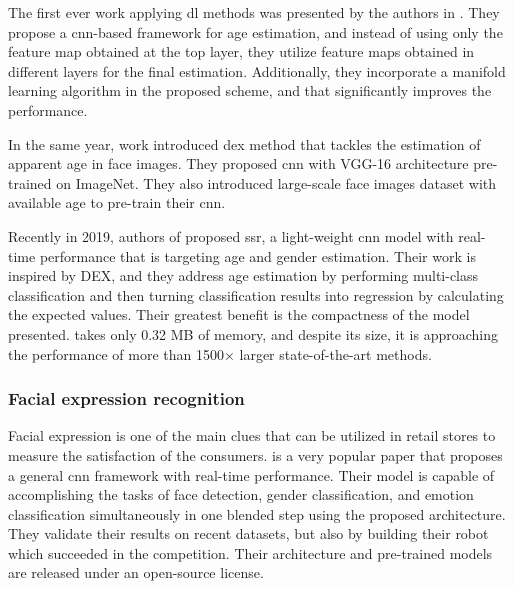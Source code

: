             The first ever work applying \gls{dl} methods was presented by the authors in \cite{wang2015deeply}. They propose a \gls{cnn}-based framework for age estimation, and instead of using only the feature map obtained at the top layer, they utilize feature maps obtained in different layers for the final estimation. Additionally, they incorporate a manifold learning algorithm in the proposed scheme, and that significantly improves the performance.

            In the same year, work \cite{rothe2015dex} introduced \gls{dex} method that tackles the estimation of apparent age in face images. They proposed \gls{cnn} with VGG-16 architecture pre-trained on ImageNet. They also introduced large-scale face images dataset with available age to pre-train their \gls{cnn}. 

            Recently in 2019, authors of \cite{yang2018ssr} proposed \gls{ssr}, a light-weight \gls{cnn} model with real-time performance that is targeting age and gender estimation. Their work is inspired by DEX, and they address age estimation by performing multi-class classification and then turning classification results into regression by calculating the expected values. Their greatest benefit is the compactness of the model presented.  takes only 0.32 MB of memory, and despite its size, it is approaching the performance of more than 1500× larger state-of-the-art methods.
            
        \subsubsection{Facial expression recognition}
            Facial expression \cite{goodfellow2013challenges} is one of the main clues that can be utilized in retail stores to measure the satisfaction of the consumers. \cite{arriaga2017real} is a very popular paper that proposes a general \gls{cnn} framework with real-time performance. Their model is capable of accomplishing the tasks of face detection, gender classification, and emotion classification simultaneously in one blended step using the proposed architecture. They validate their results on recent datasets, but also by building their robot which succeeded in the competition. Their architecture and pre-trained models are released under an open-source license.

